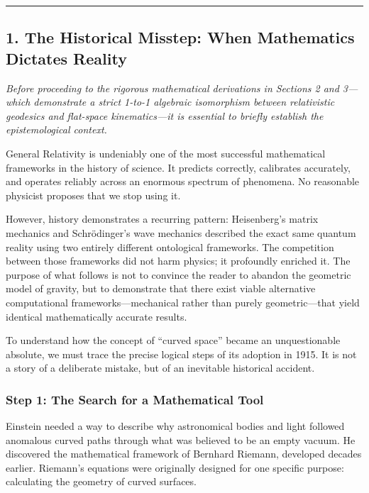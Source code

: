 \documentclass[twocolumn]{article}
\begin{document}
\begin{center}\rule{0.5\linewidth}{0.5pt}\end{center}

\subsection{1. The Historical Misstep: When Mathematics Dictates
Reality}\label{the-historical-misstep-when-mathematics-dictates-reality}

\emph{Before proceeding to the rigorous mathematical derivations in
Sections 2 and 3---which demonstrate a strict 1-to-1 algebraic
isomorphism between relativistic geodesics and flat-space
kinematics---it is essential to briefly establish the epistemological
context.}

General Relativity is undeniably one of the most successful mathematical
frameworks in the history of science. It predicts correctly, calibrates
accurately, and operates reliably across an enormous spectrum of
phenomena. No reasonable physicist proposes that we stop using it.

However, history demonstrates a recurring pattern: Heisenberg's matrix
mechanics and Schrödinger's wave mechanics described the exact same
quantum reality using two entirely different ontological frameworks. The
competition between those frameworks did not harm physics; it profoundly
enriched it. The purpose of what follows is not to convince the reader
to abandon the geometric model of gravity, but to demonstrate that there
exist viable alternative computational frameworks---mechanical rather
than purely geometric---that yield identical mathematically accurate
results.

To understand how the concept of ``curved space'' became an
unquestionable absolute, we must trace the precise logical steps of its
adoption in 1915. It is not a story of a deliberate mistake, but of an
inevitable historical accident.

\subsubsection{Step 1: The Search for a Mathematical
Tool}\label{step-1-the-search-for-a-mathematical-tool}

Einstein needed a way to describe why astronomical bodies and light
followed anomalous curved paths through what was believed to be an empty
vacuum. He discovered the mathematical framework of Bernhard Riemann,
developed decades earlier. Riemann's equations were originally designed
for one specific purpose: calculating the geometry of curved surfaces.
\end{document}
